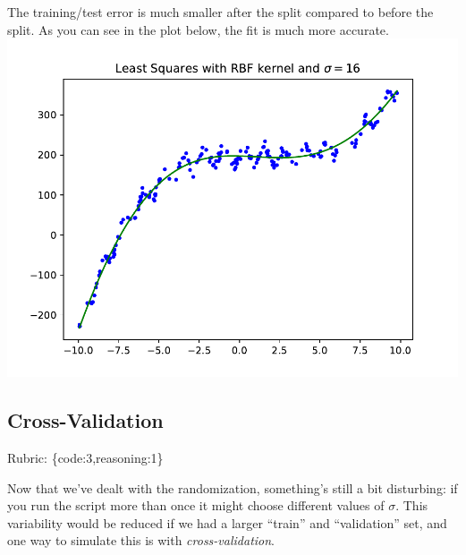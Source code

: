 \documentclass{article}
\def\rubric#1{\gre{Rubric: \{#1\}}}{}
\def\gre#1{{\color{gre}#1}}
\begin{document}
The training/test error is much smaller after the split compared to before the split. As you can see in the plot below, the fit is much more accurate. \\
\includegraphics{../figs/least_squares_rbf_good.pdf}

\subsection{Cross-Validation}
\rubric{code:3,reasoning:1}

Now that we've dealt with the randomization, something's still a bit disturbing:
if you run the script more than once it might choose different values of $\sigma$.
This variability would be reduced if we
had a larger ``train'' and ``validation'' set, and one way to simulate this is
with \emph{cross-validation}. 
\end{document}

